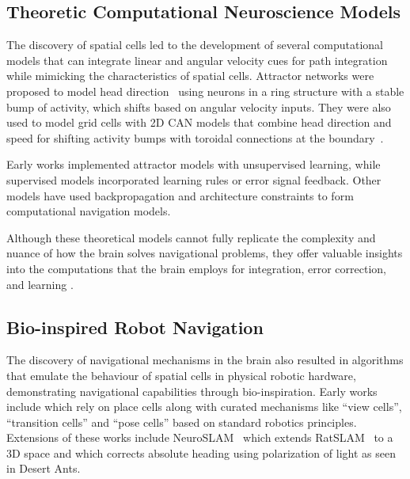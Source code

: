 \subsection{Theoretic Computational Neuroscience Models}
\label{subsec:theoreticmodels}
The discovery of spatial cells led to the development of several computational models that can integrate linear and angular velocity cues for path integration while mimicking the characteristics of spatial cells. Attractor networks were proposed to model head direction~\cite{skaggs1994model} using neurons in a ring structure with a stable bump of activity, which shifts based on angular velocity inputs. They were also used to model grid cells with 2D CAN models that combine head direction and speed for shifting activity bumps with toroidal connections at the boundary~\cite{fyhn2004spatial,mcnaughton2006path,burak2009accurate}. %
%
%

Early works \cite{zhang1996representation,samsonovich1997path,widloski2014model} implemented attractor models with unsupervised learning, while supervised models \cite{hahnloser2000permitted,arnold1991learning} incorporated learning rules or error signal feedback. Other models \cite{banino2018vector,kanitscheider2017emergence,seung1997learning} have used backpropagation and architecture constraints to form computational navigation models. 

Although these theoretical models cannot fully replicate the complexity and nuance of how the brain solves navigational problems, they offer valuable insights into the computations that the brain employs for integration, error correction, and learning \cite{khona2022attractor}. 

\subsection{Bio-inspired Robot Navigation}
\label{subsec:bioinspiredrobotnav}
The discovery of navigational mechanisms in the brain also resulted in algorithms that emulate the behaviour of spatial cells in physical robotic hardware, demonstrating navigational capabilities through bio-inspiration. Early works include \cite{gaussier2002view,cuperlier2007neurobiologically,milford2010persistent} which rely on place cells along with curated mechanisms like ``view cells'', ``transition cells'' and ``pose cells'' based on standard robotics principles. %
Extensions of these works include NeuroSLAM~\cite{yu2019neuroslam} which extends RatSLAM~\cite{milford2010persistent} to a 3D space and \cite{li2022brain} which corrects absolute heading using polarization of light as seen in Desert Ants. 

